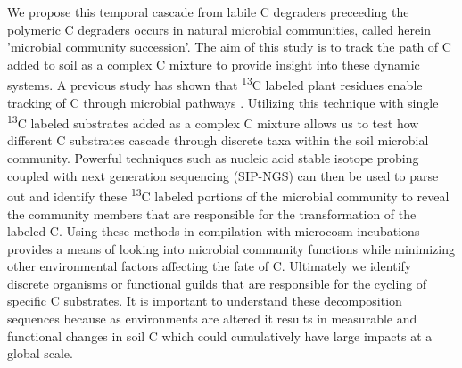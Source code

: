 We propose this temporal cascade from labile C degraders preceeding the polymeric C degraders occurs in natural microbial communities, called herein 'microbial community succession'.
The aim of this study is to track the path of C added to soil as a complex C mixture to provide insight into these dynamic systems. A previous study has shown that \textsuperscript{13}C labeled plant residues enable tracking of C through microbial pathways \cite{Evershed_2006}. Utilizing this technique with single \textsuperscript{13}C labeled substrates added as a complex C mixture allows us to test how different C substrates cascade through discrete taxa within the soil microbial community. Powerful techniques such as nucleic acid stable isotope probing coupled with next generation sequencing (SIP-NGS) can then be used to parse out and identify these \textsuperscript{13}C labeled portions of the microbial community to reveal the community members that are responsible for the transformation of the labeled C. Using these methods in compilation with microcosm incubations provides a means of looking into microbial community functions while minimizing other environmental factors affecting the fate of C. Ultimately we identify discrete organisms or functional guilds that are responsible for the cycling of specific C substrates. 
It is important to understand these decomposition sequences because as environments are altered it results in measurable and functional changes in soil C \cite{Grandy_2008} which could cumulatively have large impacts at a global scale. 